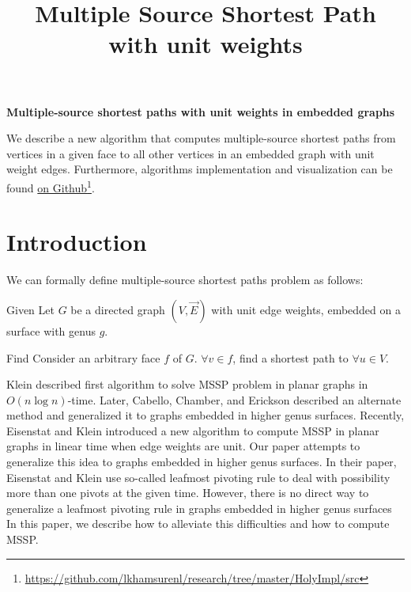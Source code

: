 \documentclass{article}
\begin{document}
\title{Multiple Source Shortest Path with unit weights}

\begin{center}
\textbf{\large Multiple-source shortest paths with unit weights in embedded
graphs}
\end{center}

\DRAFT

\begin{bigabstract}
We describe a new algorithm that computes multiple-source shortest paths from
vertices in a given face to all other vertices in an embedded graph
with unit weight edges. Furthermore, algorithms implementation and visualization can be found \href{https://github.com/lkhamsurenl/research/tree/master/HolyImpl/src}{on Github}\footnote{\url{https://github.com/lkhamsurenl/research/tree/master/HolyImpl/src}}.
\end{bigabstract}

\section{Introduction}

We can formally define multiple-source shortest paths problem as follows: 

\begin{oneshot}{Given}
Let $G$ be a directed graph $(V, \vec{E})$ with unit edge weights, embedded on a surface with genus $g$.
\end{oneshot}

\begin{oneshot}{Find}
Consider an arbitrary face $f$ of $G$. $\forall v \in f$, find a shortest path to
$\forall u \in V$.
\end{oneshot}

Klein \cite{klein2005multiple} described first algorithm to solve MSSP problem in planar graphs in $O(n \log{n})$-time. Later, Cabello, Chamber, and Erickson \cite{cabello2013multiple} described an alternate method and generalized it to graphs embedded in higher genus surfaces. 
Recently, Eisenstat and Klein \cite{eisenstat2013linear} introduced a new algorithm to compute MSSP in planar graphs in linear time when edge weights are unit. Our 
paper attempts to generalize this idea to graphs embedded in higher genus surfaces. In their paper, Eisenstat and Klein use so-called leafmost pivoting rule to deal with possibility more than one pivots at the given time. However, there is no direct way 
to generalize a leafmost pivoting rule in graphs embedded in higher genus surfaces 
In this paper, we describe how to alleviate this difficulties and how to compute MSSP. 
\end{document}

